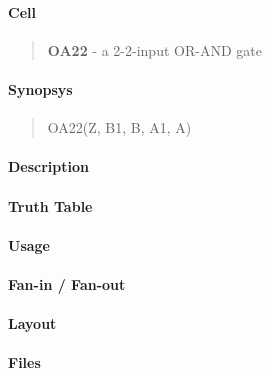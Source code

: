 \label{OA22}
\paragraph{Cell}
\begin{quote}
    \textbf{OA22} - a 2-2-input OR-AND gate
\end{quote}

\paragraph{Synopsys}
\begin{quote}
    OA22(Z, B1, B, A1, A)
\end{quote}

\paragraph{Description}

%

\paragraph{Truth Table}
%

\paragraph{Usage}

\paragraph{Fan-in / Fan-out}

\paragraph{Layout}

\paragraph{Files}
